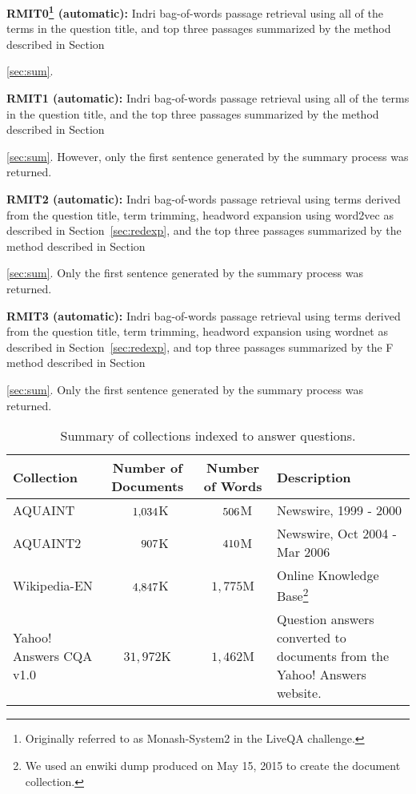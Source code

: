 \documentclass[a4paper,10pt,conference,compsocconf,final]{IEEEtran}
\newcommand\method[1]{{\sf\small{#1}}}
\def\D{\hphantom{1}}
\def\C{\hphantom{1,}}
\begin{document}
\noindent\textbf{RMIT0\footnote{Originally referred to as
Monash-System2 in the LiveQA challenge.}
(automatic): } Indri bag-of-words passage retrieval using all of the
terms in the question title, and top three passages summarized by the method
described in Section~{\ref{sec:sum}.

\medskip

\noindent\textbf{RMIT1 (automatic): } Indri bag-of-words passage
retrieval using all of the terms in the question title, and the
top three passages summarized by the method described in
Section~{\ref{sec:sum}.
However, only the first sentence generated by the summary process was
returned.

\medskip

\noindent\textbf{RMIT2 (automatic): } Indri bag-of-words passage
retrieval using terms derived from the question title, term trimming,
headword expansion using {\method{word2vec}} as described in
Section~{\ref{sec:redexp}}, and the top three passages summarized by
the method described in Section~{\ref{sec:sum}.
Only the first sentence generated by the summary process was
returned.

\medskip

\noindent\textbf{RMIT3 (automatic): } Indri bag-of-words passage
retrieval using terms derived from the question title, term trimming,
headword expansion using \method{wordnet} as described in 
Section~{\ref{sec:redexp}}, and top three passages summarized by the F
method described in Section~{\ref{sec:sum}.  Only the first
sentence generated by the summary process was returned.

\medskip

\begin{table*}[!t]
\centering
\caption{Summary of collections indexed to answer questions.\label{tbl:col}}
\begin{tabular}{p{35mm}ccp{50mm}}
\toprule
{\bf Collection} & {\bf Number of Documents} & {\bf Number of Words} & {\bf Description} \\
\midrule
AQUAINT & $\D1{,}034$K & $\C506$M & Newswire, 1999 - 2000 \\
AQUAINT2 & $\D\C907$K & $\C410$M & Newswire, Oct 2004 - Mar 2006 \\
Wikipedia-EN & $\D4{,}847$K & $1{,}775$M & Online Knowledge Base\footnote{We used an enwiki dump produced on May 15, 2015 to create the document collection.} \\
Yahoo! Answers CQA v1.0 & $31{,}972$K & $1{,}462$M & Question answers converted to documents from the Yahoo! Answers website.
\\
\bottomrule
\end{tabular}
\end{table*}

}}}}
\end{document}
